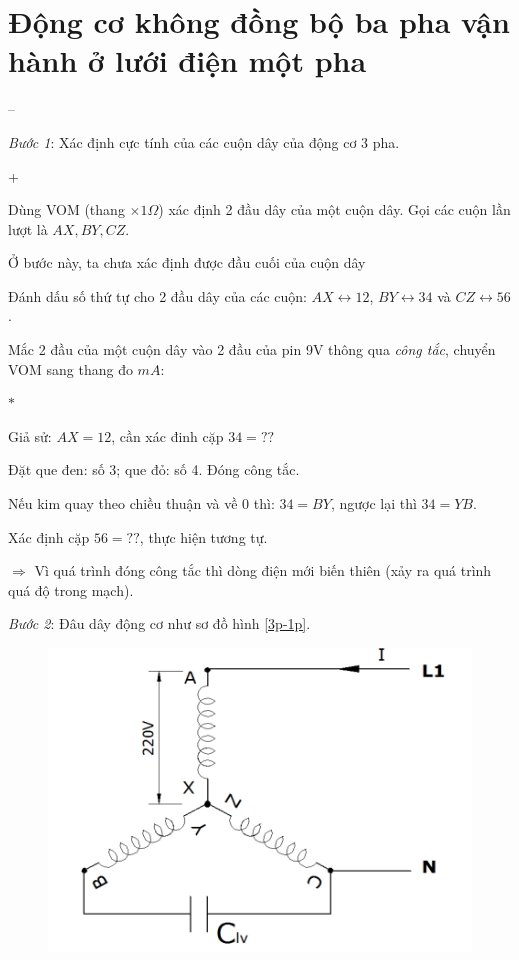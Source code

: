 \documentclass[13pt,a4paper]{extarticle}
\begin{document}
\section{Động cơ không đồng bộ ba pha vận hành ở lưới điện một pha}
\begin{list}{--}{}
\item \textit{Bước 1}: Xác định cực tính của các cuộn dây của động cơ 3 pha.
\begin{list}{+}{}
\item Dùng VOM (thang $\times 1 \Omega$) xác định 2 đầu dây của một cuộn dây. Gọi các cuộn lần lượt là $AX, BY, CZ$.

Ở bước này, ta chưa xác định được đầu cuối của cuộn dây
\item Đánh dấu số thứ tự cho 2 đầu dây của các cuộn: $AX \longleftrightarrow 12$, $BY \longleftrightarrow 34$ và $CZ \longleftrightarrow 56$.
\item Mắc 2 đầu của một cuộn dây vào 2 đầu của pin 9V thông qua \textit{công tắc}, chuyển VOM sang thang đo $mA$:
\begin{list}{$\ast$}{}
\item Giả sử: $AX = 12$, cần xác đinh cặp $34 = ??$
\item Đặt que đen: số 3; que đỏ: số 4. Đóng công tắc.
\item Nếu kim quay theo chiều thuận và về 0 thì: $34=BY$, ngược lại thì $34 = YB$.
\item Xác định cặp $56 = ??$, thực hiện tương tự.
\item[$\Longrightarrow$] Vì quá trình đóng công tắc thì dòng điện mới biến thiên (xảy ra quá trình quá độ trong mạch).
\end{list}
\end{list}
\item \textit{Bước 2}: Đâu dây động cơ như sơ đồ hình \ref{3p-1p}.
\begin{figure}[!h]
\begin{center}
\includegraphics[scale=.6]{3p-1p-Y}

\end{center}
\end{figure}
\end{list}
\end{document}
